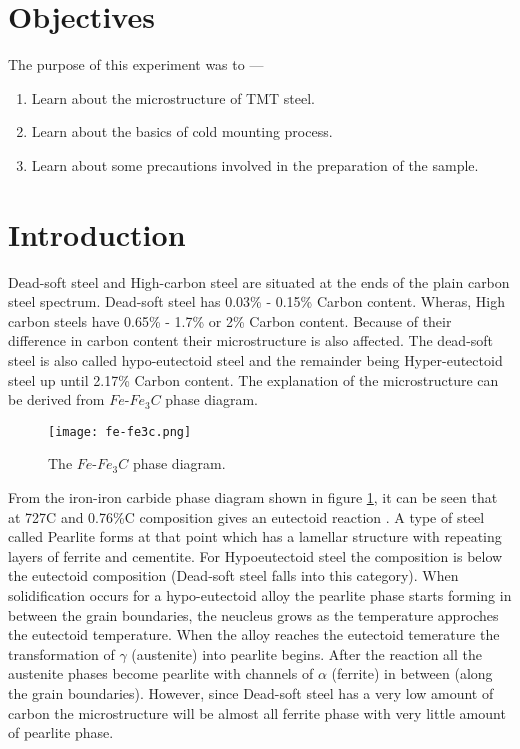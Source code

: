 \documentclass[12pt,a4paper]{article}
\begin{document}
\section{Objectives}
The purpose of this experiment was to ---
\begin{enumerate}
        \item Learn about the microstructure of TMT steel.
		\item Learn about the basics of cold mounting process.        
        \item Learn about some precautions involved in the preparation of the sample.
\end{enumerate}

\section{Introduction}

Dead-soft steel and High-carbon steel are situated at the ends of the plain carbon steel spectrum. Dead-soft steel has 0.03\% - 0.15\% Carbon content. Wheras, High carbon steels have 0.65\% - 1.7\% or 2\% Carbon content. Because of their difference in carbon content their microstructure is also affected. The dead-soft steel is also called hypo-eutectoid steel and the remainder being Hyper-eutectoid steel up until 2.17\% Carbon content. The explanation of the microstructure can be derived from $Fe$-$Fe_{3}C$ phase diagram.\cite{cal}

\begin{figure}[H]
	\centering
	\texttt{[image: fe-fe3c.png]}
	\caption{The $Fe$-$Fe_{3}C$ phase diagram.\cite{cal}}
	\label{pd}
\end{figure}

From the iron-iron carbide phase diagram shown in figure \ref{pd}, it can be seen that at 727\degree C and 0.76\%C composition gives an eutectoid reaction . A type of steel called Pearlite forms at that point which has a lamellar structure with repeating layers of ferrite and cementite. For Hypoeutectoid steel the composition is below the eutectoid composition (Dead-soft steel falls into this category). When solidification occurs for a hypo-eutectoid alloy the pearlite phase starts forming in between the grain boundaries, the neucleus grows as the temperature approches the eutectoid temperature. When the alloy reaches the eutectoid temerature the transformation of $\gamma$ (austenite) into pearlite begins. After the reaction all the austenite phases become pearlite with channels of $\alpha$ (ferrite) in between (along the grain boundaries). However, since Dead-soft steel has a very low amount of carbon the microstructure will be almost all ferrite phase with very little amount of pearlite phase.
\end{document}
